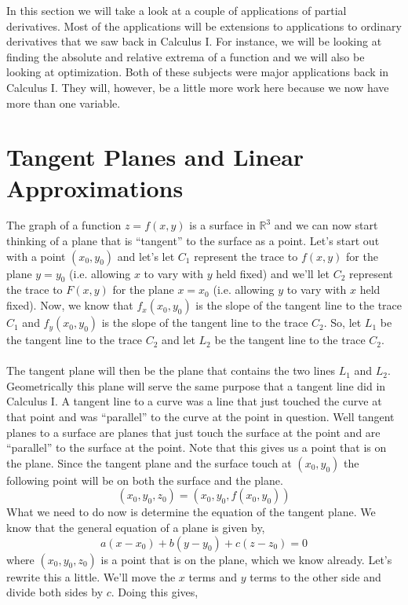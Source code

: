 \documentclass[10pt,reqno]{book}
\theoremstyle{definition}
\def\R{\mathbb{R}}
\begin{document}
	In this section we will take a look at a couple of applications of partial derivatives. Most of the applications will be extensions to applications to ordinary derivatives that we saw back in Calculus I. For instance, we will be looking at finding the absolute and relative extrema of a function and we will also be looking at optimization. Both of these subjects were major applications back in Calculus I. They will, however, be a little more work here because we now have more than one variable.
	
	\section{Tangent Planes and Linear Approximations}
	
	The graph of a function $ z = f(x,y) $ is a surface in $ \R^3 $ and we can now start thinking of a  plane that is ``tangent'' to the surface as a point. Let's start out with a point $ (x_0,y_0) $ and let's let $ C_1 $ represent the trace to $ f(x,y) $ for the plane $ y = y_0 $ (i.e. allowing $ x $ to vary with $ y $ held fixed) and we'll let $ C_2 $ represent the trace to $ F(x,y) $ for the plane $ x = x_0 $ (i.e. allowing $ y $ to vary with $ x $ held fixed). Now, we know that $ f_x(x_0,y_0) $ is the slope of the tangent line to the trace $ C_1 $ and $ f_y(x_0,y_0) $ is the slope of the tangent line to the trace $ C_2 $. So, let $ L_1 $ be the tangent line to the trace $ C_2 $ and let $ L_2 $ be the tangent line to the trace $ C_2 $.\\ \\
	The tangent plane will then be the plane that contains the two lines $ L_1 $ and $ L_2 $. Geometrically this plane will serve the same purpose that a tangent line did in Calculus I. A tangent line to a curve was a line that just touched the curve at that point and was ``parallel'' to the curve at the point in question. Well tangent planes to a surface are planes that just touch the surface at the point and are ``parallel'' to the surface at the point. Note that this gives us a point that is on the plane. Since the tangent plane and the surface touch at $ (x_0,y_0) $ the following point will be on both the surface and the plane.
	\[ (x_0,y_0,z_0) = (x_0,y_0,f(x_0,y_0)) \]
	What we need to do now is determine the equation of the tangent plane. We know that the general equation of a plane is given by,
	\[ a(x-x_0) + b(y-y_0) + c(z-z_0) = 0 \]
	where $ (x_0,y_0,z_0) $ is a point that is on the plane, which we know already. Let's rewrite this a little. We'll move the $ x $ terms and $ y $ terms to the other side and divide both sides by $ c $. Doing this gives,
\end{document}
